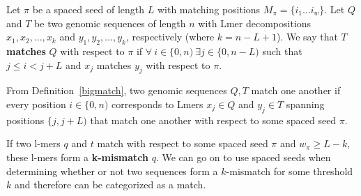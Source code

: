 \begin{defn}
Let $\pi$ be a spaced seed of length $L$ with matching positions $M_{\pi} = \lbrace i_{1} \dotsc i_{w} \rbrace$. Let $Q$ and $T$ be two genomic sequences of length $n$ with Lmer decompositions $x_{1},x_{2},\dotsc ,x_{k}$ and $y_{1},y_{2},\dotsc ,y_{k}$, respectively (where $k = n - L + 1$). We say that $T$ \textbf{matches} $Q$ with respect to $\pi$ if $\forall \  i \in \lbrace 0, n) \ \exists j \in \lbrace 0, n-L)$ such that $j \leq i < j+L$ and $x_{j}$ matches $y_{j}$ with respect to $\pi$.
\label{bigmatch}
\end{defn}

From Definition~\ref{bigmatch}, two genomic sequences $Q,T$ match one another if every position $i \in \lbrace 0,n)$ corresponds to Lmers $x_{j} \in Q$ and $y_{j} \in T$ spanning positions $\lbrace j,j+L)$ that match one another with respect to some spaced seed $\pi$.

If two l-mers $q$ and $t$ match with respect to some spaced seed $\pi$ and $w_{\pi} \geq L-k$, these l-mers form a \textbf{k-mismatch} $q$. We can go on to use spaced seeds when determining whether or not two sequences form a $k$-mismatch for some threshold $k$ and therefore can be categorized as a match.

